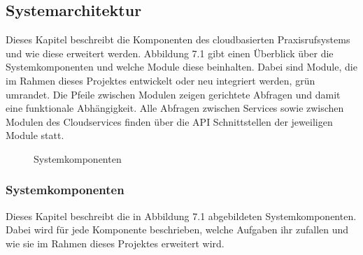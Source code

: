 \subsection{Systemarchitektur}

Dieses Kapitel beschreibt die Komponenten des cloudbasierten Praxisrufsystems und wie diese erweitert werden.
Abbildung 7.1 gibt einen Überblick über die Systemkomponenten und welche Module diese beinhalten.
Dabei sind Module, die im Rahmen dieses Projektes entwickelt oder neu integriert werden, grün umrandet.
Die Pfeile zwischen Modulen zeigen gerichtete Abfragen und damit eine funktionale Abhängigkeit.
Alle Abfragen zwischen Services sowie zwischen Modulen des Cloudservices finden über die API Schnittstellen der jeweiligen Module statt.

\begin{figure}[h]
    \centering
    \begin{minipage}[b]{0.8\textwidth}
        \caption{Systemkomponenten}
    \end{minipage}
\end{figure}

\subsubsection{Systemkomponenten}

Dieses Kapitel beschreibt die in Abbildung 7.1 abgebildeten Systemkomponenten.
Dabei wird für jede Komponente beschrieben, welche Aufgaben ihr zufallen und wie sie im Rahmen dieses Projektes erweitert wird.

